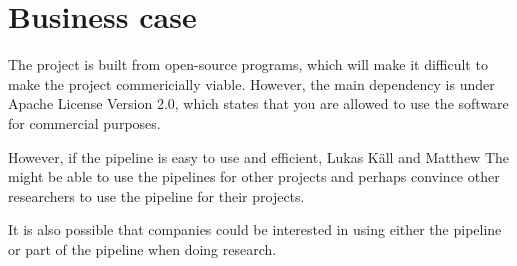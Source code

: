 \section{Business case}

The project is built from open-source programs, which will make it difficult to make the project commericially viable. However, the main dependency is under Apache License Version 2.0, which states that you are allowed to use the software for commercial purposes.

However, if the pipeline is easy to use and efficient, Lukas Käll and Matthew The might be able to use the pipelines for other projects and perhaps convince other researchers to use the pipeline for their projects.

It is also possible that companies could be interested in using either the pipeline or part of the pipeline when doing research.
